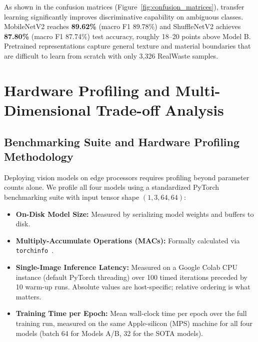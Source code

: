 \documentclass[11pt,a4paper]{article}
\begin{document}
As shown in the confusion matrices (Figure~\ref{fig:confusion_matrices}), transfer learning significantly improves discriminative capability on ambiguous classes. MobileNetV2 reaches \textbf{89.62\%} (macro F1 89.78\%) and ShuffleNetV2 achieves \textbf{87.80\%} (macro F1 87.74\%) test accuracy, roughly 18--20 points above Model B. Pretrained representations capture general texture and material boundaries that are difficult to learn from scratch with only 3,326 RealWaste samples.

\section{Hardware Profiling and Multi-Dimensional Trade-off Analysis}
\label{sec:hardware}

\subsection{Benchmarking Suite and Hardware Profiling Methodology}
Deploying vision models on edge processors requires profiling beyond parameter counts alone. We profile all four models using a standardized PyTorch~\cite{pytorch} benchmarking suite with input tensor shape $(1, 3, 64, 64)$:
\begin{itemize}[leftmargin=*,itemsep=1pt]
  \item \textbf{On-Disk Model Size:} Measured by serializing model weights and buffers to disk.
  \item \textbf{Multiply-Accumulate Operations (MACs):} Formally calculated via \texttt{torchinfo}~\cite{torchinfo}.
  \item \textbf{Single-Image Inference Latency:} Measured on a Google Colab CPU instance (default PyTorch threading) over 100 timed iterations preceded by 10 warm-up runs. Absolute values are host-specific; relative ordering is what matters.
  \item \textbf{Training Time per Epoch:} Mean wall-clock time per epoch over the full training run, measured on the same Apple-silicon (MPS) machine for all four models (batch 64 for Models A/B, 32 for the SOTA models).
\end{itemize}
\end{document}
